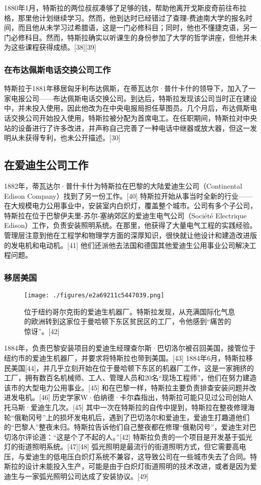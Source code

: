 1880年1月，特斯拉的两位叔叔凑够了足够的钱，帮助他离开戈斯皮奇前往布拉格，那里他计划继续学习。然而，他到达时已经错过了查理-费迪南大学的报名时间，而且他从未学习过希腊语，这是一门必修科目；同时，他也不懂捷克语，另一门必修科目。然而，特斯拉确实以听课生的身份参加了大学的哲学讲座，但他并未为这些课程获得成绩。[38][39]
\subsubsection{在布达佩斯电话交换公司工作}
特斯拉于1881年移居匈牙利布达佩斯，在蒂瓦达尔·普什卡什的领导下，加入了一家电报公司——布达佩斯电话交换公司。到达后，特斯拉发现该公司当时正在建设中，并未投入使用，因此他改为在中央电报局担任草图员。几个月后，布达佩斯电话交换公司开始投入使用，特斯拉被分配为首席电工。在任职期间，特斯拉对中央站的设备进行了许多改进，并声称自己完善了一种电话中继器或放大器，但这一发明从未获得专利，也未公开描述。[30]\subsection{在爱迪生公司工作}  
1882年，蒂瓦达尔·普什卡什为特斯拉在巴黎的大陆爱迪生公司（Continental Edison Company）找到了另一份工作。[40] 特斯拉开始从事当时全新的行业——在大规模电力公用事业中，安装室内白炽灯，覆盖整个城市。公司有多个子公司，特斯拉在位于巴黎伊夫里-苏尔-塞纳郊区的爱迪生电气公司（Société Electrique Edison）工作，负责安装照明系统。在那里，他获得了大量电气工程的实践经验。管理层注意到他在工程学和物理学方面的深厚知识，很快就让他设计和建造改进版的发电机和电动机。[41] 他们还派他去法国和德国其他爱迪生公用事业公司解决工程问题。
\subsubsection{移居美国}
\begin{figure}[ht]
\centering
\texttt{[image: ./figures/e2a69211c5447039.png]}
\caption{位于纽约哥尔克街的爱迪生机器厂。特斯拉发现，从充满国际化气息的欧洲转到这家位于曼哈顿下东区贫民区的工厂，令他感到“痛苦的惊讶”。[42]} \label{fig_Tesla_5}
\end{figure}
1884年，负责巴黎安装项目的爱迪生经理查尔斯·巴切洛尔被召回美国，接管位于纽约市的爱迪生机器厂，并要求将特斯拉也带到美国。[43] 1884年6月，特斯拉移民美国[44]，并几乎立刻开始在位于曼哈顿下东区的机器厂工作，这是一家拥挤的工厂，拥有数百名机械师、工人、管理人员和20名“现场工程师”，他们在努力建造该市的大型电力公用事业。[45] 和在巴黎一样，特斯拉主要负责排查安装问题并改进发电机。[46] 历史学家W·伯纳德·卡尔森指出，特斯拉可能只见过公司创始人托马斯·爱迪生几次。[45] 其中一次在特斯拉的自传中提到，特斯拉在整夜修理海轮“俄勒冈号”上的损坏发电机后，遇到了巴切洛尔和爱迪生，爱迪生打趣道他们的“巴黎人”整夜未归。特斯拉告诉他们自己整夜都在修理“俄勒冈号”，爱迪生对巴切洛尔评论道：“这是个了不起的人。”[42] 特斯拉负责的一个项目是开发基于弧光灯的街道照明系统。[47][48] 弧光照明是最流行的街道照明方式，但它需要高电压，与爱迪生的低电压白炽灯系统不兼容，这导致公司在一些城市失去了合同。特斯拉的设计未能投入生产，可能是由于白炽灯街道照明的技术改进，或者是因为爱迪生与一家弧光照明公司达成了安装协议。[49]

